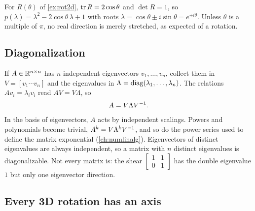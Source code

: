 \begin{example}
\label{ex:rot2d-eig}
For $R(\theta)$ of \cref{ex:rot2d}, $\operatorname{tr} R = 2\cos\theta$ and $\det R = 1$, so $p(\lambda) = \lambda^2 - 2\cos\theta\,\lambda + 1$ with
roots $\lambda = \cos\theta \pm i\sin\theta = e^{\pm i\theta}$. Unless $\theta$ is a multiple of $\pi$, no real direction is merely
stretched, as expected of a rotation.
\end{example}

\subsection{Diagonalization}

If $A \in \mathbb{R}^{n\times n}$ has $n$ independent eigenvectors $v_1, \dots, v_n$, collect them in $V = [v_1 \cdots v_n]$ and the
eigenvalues in $\Lambda = \operatorname{diag}(\lambda_1, \dots, \lambda_n)$. The relations $Av_i = \lambda_iv_i$ read $AV = V\Lambda$, so
\begin{equation}
  A = V\Lambda V^{-1} .
\end{equation}
In the basis of eigenvectors, $A$ acts by independent scalings. Powers and polynomials become trivial,
$A^k = V\Lambda^kV^{-1}$, and so do the power series used to define the matrix exponential (\cref{ch:numlinalg}). Eigenvectors
of distinct eigenvalues are always independent, so a matrix with $n$ distinct eigenvalues is diagonalizable. Not every
matrix is: the shear $\begin{bmatrix}1 & 1\\0 & 1\end{bmatrix}$ has the double eigenvalue $1$ but only one eigenvector
direction.

\subsection{Every 3D rotation has an axis}

